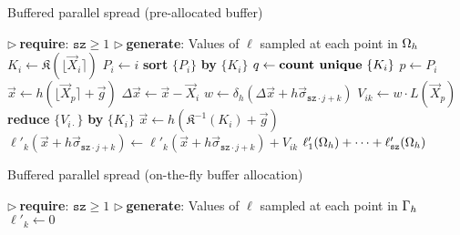 \begin{algorithm}
\caption{Buffered parallel spread (pre-allocated buffer)}
\label{algo:pa-spread}
\begin{algorithmic}[1]
\State $\triangleright\ $\textbf{require}: $\texttt{sz} \ge 1$
\State $\triangleright\ $\textbf{generate}: Values of $\ell$ sampled at each point in $\Omega_h$
    \State $K_i \gets \mathfrak{K}(\lfloor\vec{X}_i\rceil)$ 
    \State $P_i \gets i$ 
\EndFor
\State \textbf{sort} $\{P_i\}$ \textbf{by} $\{K_i\}$
\State $q \gets \text{\textbf{count unique} }\{K_i\}$
        \State $p \gets P_i$
        \State $\vec{x} \gets h(\lfloor\vec{X}_p\rceil+\vec{g})$
        \State $\Delta\vec{x} \gets \vec{x}-\vec{X}_i$
            \State $w \gets \delta_h(\Delta\vec{x}+h\vec{\sigma}_{\texttt{sz}\cdot j + k})$
            \State $V_{ik} \gets w \cdot L(\vec{X}_p)$ 
        \EndFor
    \EndFor
    \State \textbf{reduce} $\{V_{i\cdot}\}$ \textbf{by} $\{K_i\}$
        \State $\vec{x} \gets h(\mathfrak{K}^{-1}(K_i) + \vec{g})$
        \State $\ell'_k(\vec{x} + h\vec{\sigma}_{\texttt{sz}\cdot j + k}) \gets
                \ell'_k(\vec{x} + h\vec{\sigma}_{\texttt{sz}\cdot j + k}) + V_{ik}$
        \EndFor
    \EndFor
\EndFor
\State \Return $\ell'_1(\Omega_h) + \cdots + \ell'_\texttt{sz}(\Omega_h)$
\EndProcedure
\end{algorithmic}
\end{algorithm}

\begin{algorithm}
\caption{Buffered parallel spread (on-the-fly buffer allocation)}
\label{algo:otf-spread}
\begin{algorithmic}[1]
\State $\triangleright\ $\textbf{require}: $\texttt{sz} \ge 1$
\State $\triangleright\ $\textbf{generate}: Values of $\ell$ sampled at each point in $\Gamma_h$
    \State $\ell'_k \gets 0$
\EndFor
\State \Return {} 
\EndProcedure {}
\end{algorithmic}
\end{algorithm}
\egroup

